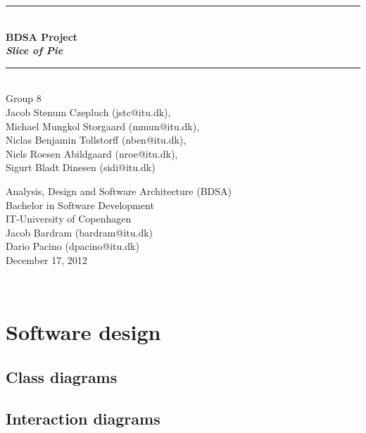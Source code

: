 \documentclass[a4paper,11pt]{article}
\begin{document}
\begin{titlepage}
\centering \parindent=0pt
\newcommand{\HRule}{\rule{\textwidth}{1mm}}
 \HRule\\[1cm]\Huge\bfseries
BDSA Project\\\emph{Slice of Pie}\\[0.7cm]
\HRule\\[4cm]  \large Group 8
\\Jacob Stenum Czepluch (jstc@itu.dk), 
\\Michael Mungkol Storgaard (mmun@itu.dk),
\\Niclas Benjamin Tollstorff (nben@itu.dk), 
\\Niels Roesen Abildgaard (nroe@itu.dk), 
\\Sigurt Bladt Dinesen (sidi@itu.dk) \\

 \normalsize %
\thispagestyle{empty}
\begin{flushleft}
Analysis, Design and Software Architecture (BDSA)\\
Bachelor in Software Development\\
IT-University of Copenhagen\\
Jacob Bardram (bardram@itu.dk)\\
Dario Pacino (dpacino@itu.dk) \\
December 17, 2012 \end{flushleft}
\end{titlepage}

\tableofcontents
\pagebreak

\pagebreak
\setcounter{page}{4}


\pagebreak


\pagebreak

\pagebreak
~ %

\pagebreak
\section{Software design}


\subsection{Class diagrams}


\subsection{Interaction diagrams}

\end{document}
